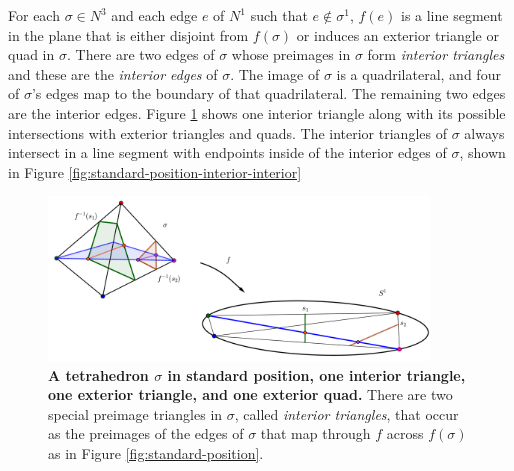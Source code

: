 For each $\sigma\in N^3$ and each edge $e$ of $N^1$ such that $e\notin\sigma^1$, $f(e)$ is a line segment in the plane that is either disjoint from $f(\sigma)$ or induces an exterior triangle or quad in $\sigma$.
There are two edges of $\sigma$ whose preimages in $\sigma$ form \emph{interior triangles} and these are the \emph{interior edges} of $\sigma$.
The image of $\sigma$ is a quadrilateral, and four of $\sigma$'s edges map to the boundary of that quadrilateral.
The remaining two edges are the interior edges.
Figure \ref{fig:standard-position-interior-exterior} shows one interior triangle along with its possible intersections with exterior triangles and quads.
The interior triangles of $\sigma$ always intersect in a line segment with endpoints inside of the interior edges of $\sigma$, shown in Figure \ref{fig:standard-position-interior-interior}

\begin{figure}[h!]
	\centering
	\includegraphics[width=0.9\textwidth]{figures/standard-position-interior-exterior.png}
	\caption{
		\textbf{A tetrahedron $\sigma$ in standard position, one interior triangle, one exterior triangle, and one exterior quad.}
		There are two special preimage triangles in $\sigma$, called \emph{interior triangles}, that occur as the preimages of the edges of $\sigma$ that map through $f$ across $f(\sigma)$ as in Figure \ref{fig:standard-position}.
	}
	\label{fig:standard-position-interior-exterior}
\end{figure}

